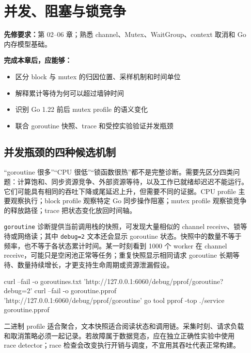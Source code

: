\documentclass[UTF8,fontset=fandol,openany,11pt]{ctexbook}
\begin{document}
\chapter{并发、阻塞与锁竞争}
\label{ch:07}
\par\medskip
\noindent\textbf{先修要求：}第 02–06 章；熟悉 channel、Mutex、WaitGroup、context 取消和 Go 内存模型基础。

\noindent\textbf{完成本章后，应能够：}
\begin{itemize}
\item 区分 block 与 mutex 的归因位置、采样机制和时间单位
\item 解释累计等待为何可以超过墙钟时间
\item 识别 Go 1.22 前后 mutex profile 的语义变化
\item 联合 goroutine 快照、trace 和受控实验验证并发瓶颈
\end{itemize}
\section{并发瓶颈的四种候选机制}
“goroutine 很多”“CPU 很低”“锁函数很热”都不是完整诊断。需要先区分四类问题：计算饱和、同步资源竞争、外部资源等待，以及工作已就绪却迟迟不能运行。它们可能具有相同的吞吐下降或尾延迟上升，但需要不同的证据。CPU profile 主要观察执行；block profile 观察特定 Go 同步操作阻塞；mutex profile 观察锁竞争的释放路径；trace 把状态变化放回时间轴。

\texttt{goroutine} 诊断提供当前调用栈的快照，可发现大量相似的 channel receive、锁等待或网络读；其中 \texttt{debug=2} 文本还会显示 goroutine 状态。快照中的数量不等于频率，也不等于各状态累计时间。某一时刻看到 1000 个 worker 在 channel receive，可能只是空闲池正常等任务；重复快照显示相同请求 goroutine 长期等待、数量持续增长，才更支持生命周期或资源泄漏假设。

\begin{codeblock}
curl --fail -o goroutines.txt   'http://127.0.0.1:6060/debug/pprof/goroutine?debug=2'
curl --fail -o goroutine.pprof   'http://127.0.0.1:6060/debug/pprof/goroutine'
go tool pprof -top ./service goroutine.pprof
\end{codeblock}

二进制 profile 适合聚合，文本快照适合阅读状态和调用链。采集时刻、请求负载和取消策略必须一起记录。若故障属于数据竞态，应在独立正确性实验中使用 race detector；race 检查会改变执行开销与调度，不宜用其吞吐代表正常构建。
\end{document}
